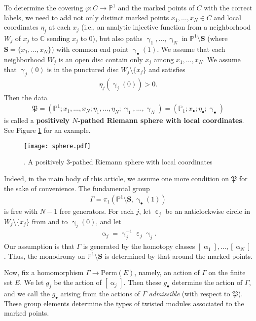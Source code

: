 \documentclass[12pt,a4paper,notitlepage]{article}
\theoremstyle{definition}
\theoremstyle{plain}
\newcommand{\fk}{\mathfrak}
\newcommand{\blt}{\bullet}
\newcommand{\Cbb}{\mathbb C}
\newcommand{\Pbb}{\mathbb P}
\newcommand{\Sbf}{\mathbf{S}}
\newcommand{\Perm}{\mathrm{Perm}}
\numberwithin{equation}{subsection}
\begin{document}
To determine the covering $\varphi:C\rightarrow\Pbb^1$ and the marked points of $C$ with the correct labels, we need to add not only distinct marked points $x_1,\dots,x_N\in C$ and local coordinates $\eta_j$ at each $x_j$ (i.e., an analytic injective function from a neighborhood $W_j$ of $x_j$ to $\Cbb$ sending $x_j$ to $0$), but also paths $\upgamma_1,\dots,\upgamma_N$ in $\Pbb^1\setminus\Sbf$ (where $\Sbf=\{x_1,\dots,x_N\}$) with common end point $\upgamma_\blt(1)$. We assume that  each neighborhood $W_j$ is an open disc contain only $x_j$ among $x_1,\dots,x_N$. We assume that $\upgamma_j(0)$ is in the punctured disc $W_j\setminus\{x_j\}$ and satisfies
\begin{align}
\eta_j(\upgamma_j(0))>0.\label{eq101}	
\end{align}
Then the data
\begin{align}
\fk P=(\Pbb^1;x_1,\dots,x_N;\eta_1,\dots,\eta_N;\upgamma_1,\dots,\upgamma_N)=(\Pbb_1;x_\blt;\eta_\blt;\upgamma_\blt)\label{eq102}
\end{align}
is called a \textbf{positively $N$-pathed Riemann sphere with local coordinates}. See Figure \ref{fig1} for an example.
\begin{figure}[h]
	\centering
	\texttt{[image: sphere.pdf]}
	\caption{. A positively $3$-pathed Riemann sphere with local coordinates}
	\label{fig1}
\end{figure}

Indeed, in the main body of this article, we assume one more condition on  $\fk P$ for the sake of convenience. The fundamental group
\begin{align*}
\Gamma=\pi_1(\Pbb^1\setminus\Sbf,\upgamma_\blt(1))	
\end{align*}
is free with $N-1$ free generators. For each $j$, let $\upepsilon_j$ be an anticlockwise circle in $W_j\setminus\{x_j\}$ from and to $\upgamma_j(0)$, and let
\begin{align*}
\upalpha_j=\upgamma_j^{-1}\upepsilon_j\upgamma_j.	
\end{align*}
Our assumption is that $\Gamma$ is generated by the homotopy classes $[\upalpha_1],\dots,[\upalpha_N]$. Thus, the monodromy on $\Pbb^1\setminus\Sbf$ is determined by that around the marked points.


Now, fix a homomorphism $\Gamma\rightarrow\Perm(E)$, namely, an action of $\Gamma$ on the finite set $E$. We let $g_j$ be the action of $[\upalpha_j]$. Then these $g_\blt$ determine the action of $\Gamma$, and we call the $g_\blt$ arising from the actions of $\Gamma$ \textit{admissible}  (with respect to $\fk P$). These group elements determine the types of twisted modules associated to the marked points.
\end{document}
